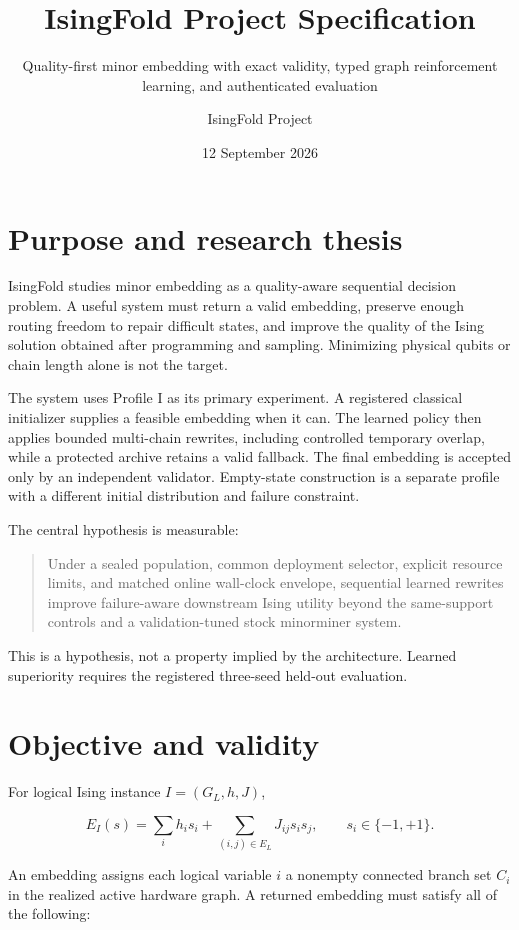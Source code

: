 \documentclass[
  american,
  10pt,
  a4paper,
]{article}
\title{IsingFold Project Specification}
\subtitle{Quality-first minor embedding with exact validity, typed graph
reinforcement learning, and authenticated evaluation}
\author{IsingFold Project}
\date{12 September 2026}
\begin{document}
\maketitle

{
\setcounter{tocdepth}{3}
\tableofcontents
}
\section{Purpose and research thesis}\label{purpose-and-research-thesis}

IsingFold studies minor embedding as a quality-aware sequential decision
problem. A useful system must return a valid embedding, preserve enough
routing freedom to repair difficult states, and improve the quality of
the Ising solution obtained after programming and sampling. Minimizing
physical qubits or chain length alone is not the target.

The system uses Profile I as its primary experiment. A registered
classical initializer supplies a feasible embedding when it can. The
learned policy then applies bounded multi-chain rewrites, including
controlled temporary overlap, while a protected archive retains a valid
fallback. The final embedding is accepted only by an independent
validator. Empty-state construction is a separate profile with a
different initial distribution and failure constraint.

The central hypothesis is measurable:

\begin{quote}
Under a sealed population, common deployment selector, explicit resource
limits, and matched online wall-clock envelope, sequential learned
rewrites improve failure-aware downstream Ising utility beyond the
same-support controls and a validation-tuned stock minorminer system.
\end{quote}

This is a hypothesis, not a property implied by the architecture.
Learned superiority requires the registered three-seed held-out
evaluation.

\section{Objective and validity}\label{objective-and-validity}

For logical Ising instance \(I=(G_L,h,J)\),

\[
E_I(s)=\sum_i h_i s_i+\sum_{(i,j)\in E_L}J_{ij}s_i s_j,
\qquad s_i\in\{-1,+1\}.
\]

An embedding assigns each logical variable \(i\) a nonempty connected
branch set \(C_i\) in the realized active hardware graph. A returned
embedding must satisfy all of the following:
\end{document}
